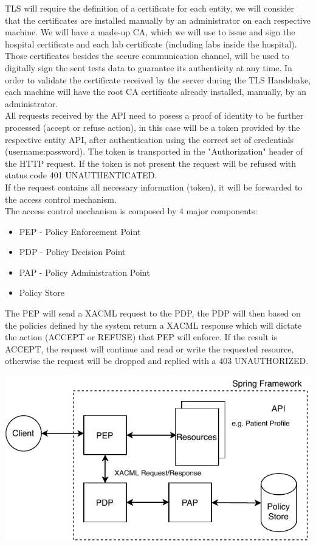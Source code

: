 TLS will require the definition of a certificate for each entity, we will consider that the certificates are installed manually by an administrator on each respective machine.
We will have a made-up CA, which we will use to issue and sign the hospital certificate and each lab certificate (including labs inside the hospital). Those certificates besides the secure communication channel, will be used to digitally sign the sent tests data to guarantee its authenticity at any time.
In order to validate the certificate received by the server during the TLS Handshake, each machine will have the root CA certificate already installed, manually, by an administrator.\\ 

All requests received by the API need to posess a proof of identity to be further processed (accept or refuse action), in this case will be a token provided by the respective entity API, after authentication using the correct set of credentials (username:password). The token is transported in the "Authorization" header of the HTTP request. If the token is not present the request will be refused with status code 401 UNAUTHENTICATED. \\

If the request contains all necessary information (token), it will be forwarded to the access control mechanism. \\

The access control mechanism is composed by 4 major components:
\begin{itemize}
	\item PEP - Policy Enforcement Point
	\item PDP - Policy Decision Point
	\item PAP - Policy Administration Point
	\item Policy Store
\end{itemize}

The PEP will send a XACML request to the PDP, the PDP will then based on the policies defined by the system return a XACML response which will dictate the action (ACCEPT or REFUSE) that PEP will enforce. If the result is ACCEPT, the request will continue and read or write the requested resource, otherwise the request will be dropped and replied with a 403 UNAUTHORIZED.

	\includegraphics[width=.6\textwidth]{figs/access_control.pdf}
	

